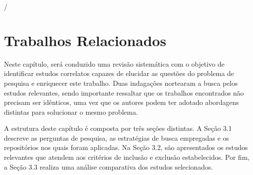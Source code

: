 /%
\chapter{Trabalhos Relacionados}
\label{c_cap3}
Neste capítulo, será conduzido uma revisão sistemática com o objetivo de identificar estudos correlatos capazes de elucidar as questões do problema de pesquisa e enriquecer este trabalho. Duas indagações nortearam a busca pelos estudos relevantes, sendo importante ressaltar que os trabalhos encontrados não precisam ser idênticos, uma vez que os autores podem ter adotado abordagens distintas para solucionar o mesmo problema.

A estrutura deste capítulo é composta por três seções distintas. A Seção 3.1 descreve as perguntas de pesquisa, as estratégias de busca empregadas e os repositórios nos quais foram aplicadas. Na Seção 3.2, são apresentados os estudos relevantes que atendem aos critérios de inclusão e exclusão estabelecidos. Por fim, a Seção 3.3 realiza uma análise comparativa dos estudos selecionados.


    
    





